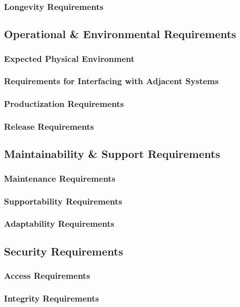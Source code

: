 \documentclass[titlepage]{article}
\begin{document}
\subsubsection{Longevity Requirements}

\subsection{Operational \& Environmental Requirements}
\subsubsection{Expected Physical Environment}
\subsubsection{Requirements for Interfacing with Adjacent Systems}
\subsubsection{Productization Requirements}
\subsubsection{Release Requirements}

\subsection{Maintainability \& Support Requirements}
\subsubsection{Maintenance Requirements}
\subsubsection{Supportability Requirements}
\subsubsection{Adaptability Requirements}

\subsection{Security Requirements}
\subsubsection{Access Requirements}
\subsubsection{Integrity Requirements}
\end{document}
